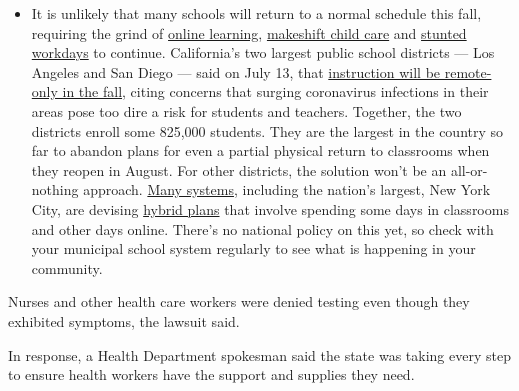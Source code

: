 \begin{itemize}
  \begin{itemize}
  \tightlist
  \item
    It is unlikely that many schools will return to a normal schedule
    this fall, requiring the grind of
    \href{https://www.nytimes3xbfgragh.onion/2020/06/05/us/coronavirus-education-lost-learning.html?action=click\&pgtype=Article\&state=default\&region=MAIN_CONTENT_3\&context=storylines_faq}{online
    learning},
    \href{https://www.nytimes3xbfgragh.onion/2020/05/29/us/coronavirus-child-care-centers.html?action=click\&pgtype=Article\&state=default\&region=MAIN_CONTENT_3\&context=storylines_faq}{makeshift
    child care} and
    \href{https://www.nytimes3xbfgragh.onion/2020/06/03/business/economy/coronavirus-working-women.html?action=click\&pgtype=Article\&state=default\&region=MAIN_CONTENT_3\&context=storylines_faq}{stunted
    workdays} to continue. California's two largest public school
    districts --- Los Angeles and San Diego --- said on July 13, that
    \href{https://www.nytimes3xbfgragh.onion/2020/07/13/us/lausd-san-diego-school-reopening.html?action=click\&pgtype=Article\&state=default\&region=MAIN_CONTENT_3\&context=storylines_faq}{instruction
    will be remote-only in the fall}, citing concerns that surging
    coronavirus infections in their areas pose too dire a risk for
    students and teachers. Together, the two districts enroll some
    825,000 students. They are the largest in the country so far to
    abandon plans for even a partial physical return to classrooms when
    they reopen in August. For other districts, the solution won't be an
    all-or-nothing approach.
    \href{https://bioethics.jhu.edu/research-and-outreach/projects/eschool-initiative/school-policy-tracker/}{Many
    systems}, including the nation's largest, New York City, are
    devising
    \href{https://www.nytimes3xbfgragh.onion/2020/06/26/us/coronavirus-schools-reopen-fall.html?action=click\&pgtype=Article\&state=default\&region=MAIN_CONTENT_3\&context=storylines_faq}{hybrid
    plans} that involve spending some days in classrooms and other days
    online. There's no national policy on this yet, so check with your
    municipal school system regularly to see what is happening in your
    community.
  \end{itemize}
\end{itemize}

Nurses and other health care workers were denied testing even though
they exhibited symptoms, the lawsuit said.

In response, a Health Department spokesman said the state was taking
every step to ensure health workers have the support and supplies they
need.

